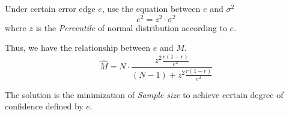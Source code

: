 \documentclass[../main.tex]{subfiles}
\begin{document}
Under certain error edge $e$, use the equation between $e$ and $\sigma^2$
\begin{equation*}
    e^2 = z^2 \cdot \sigma^2
\end{equation*}
where $z$ is the \emph{Percentile} of normal distribution according to $e$.

Thus, we have the relationship between $e$ and $M$.
\begin{equation*}
    \hat{M} = N \cdot \frac{z^2\frac{r(1-r)}{e^2}}{(N-1)+z^2\frac{r(1-r)}{e^2}}
\end{equation*}

The solution is the minimization of \emph{Sample size} to achieve certain degree of confidence defined by $e$.
\end{document}
